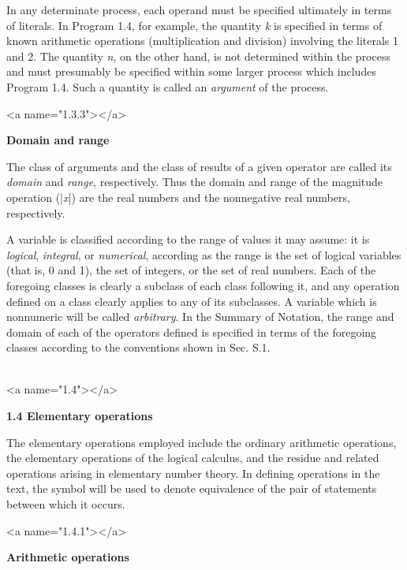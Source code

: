\par In any determinate process, each operand must be specified ultimately in terms of literals. In Program 1.4, for example, the quantity \textit{k} is specified in terms of known arithmetic operations (multiplication and division) involving the literals 1 and 2. The quantity \textit{n}, on the other hand, is not determined within the process and must presumably be specified within some larger process which includes Program 1.4. Such a quantity is called an \textit{argument} of the process.



<a name="1.3.3"></a>
\par \textbf{Domain and range}

\par The class of arguments and the class of results of a given operator are called its \textit{domain} and \textit{range}, respectively. Thus the domain and range of the magnitude operation (|\textit{x}|) are the real numbers and the nonnegative real numbers, respectively.

\par A variable is classified according to the range of values it may assume: it is \textit{logical}, \textit{integral}, or \textit{numerical}, according as the range is the set of logical variables (that is, 0 and 1), the set of integers, or the set of real numbers. Each of the foregoing classes is clearly a subclass of each class following it, and any operation defined on a class clearly applies to any of its subclasses. A variable which is nonnumeric will be called \textit{arbitrary}. In the Summary of Notation, the range and domain of each of the operators defined is specified in terms of the foregoing classes according to the conventions shown in Sec. S.1.
\\\ 



<a name="1.4"></a>
\par \textbf{1.4 Elementary operations}

\par The elementary operations employed include the ordinary arithmetic operations, the elementary operations of the logical calculus, and the residue and related operations arising in elementary number theory. In defining operations in the text, the symbol \leftrightarrow will be used to denote equivalence of the pair of statements between which it occurs.

<a name="1.4.1"></a>
\par \textbf{Arithmetic operations}

